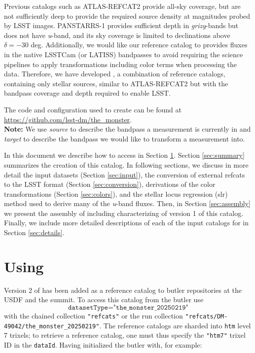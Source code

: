 Previous catalogs such as ATLAS-REFCAT2 \citep{Tonry:2018} provide all-sky coverage, but are not sufficiently deep to provide the required source density at magnitudes probed by LSST images.
PANSTARRS-1\citep[PS1;][]{Chambers:2016} provides sufficient depth in \emph{grizy}-bands but does not have \emph{u}-band, and its sky coverage is limited to declinations above $\delta = -30$ deg.
Additionally, we would like our reference catalog to provides fluxes in the native LSSTCam (or LATISS) bandpasses to avoid requiring the science pipelines to apply transformations including color terms when processing the data.
Therefore, we have developed \monster, a combination of reference catalogs, containing only stellar sources, similar to ATLAS-REFCAT2 but with the bandpass coverage and depth required to enable LSST.

The code and configuration used to create \monster can be found at \url{https://github.com/lsst-dm/the_monster}.\\

\textbf{Note:} We use \emph{source} to describe the bandpass a measurement is currently in and \emph{target} to describe the bandpass we would like to transform a measurement into.

In this document we describe how to access \monster in Section \ref{sec:using}. Section \ref{sec:summary} summarizes the creation of this catalog. In following sections, we discuss in more detail the input datasets (Section \ref{sec:input}), the
conversion of external refcats to the LSST format (Section \ref{sec:conversion}), derivations of the color transformations (Section \ref{sec:colors}), and the stellar locus regression (slr) method used to derive many of the \emph{u}-band fluxes.
Then, in Section \ref{sec:assembly} we present the assembly of \monster including characterizing of version 1 of this catalog.
Finally, we include more detailed descriptions of each of the input catalogs for \monster in Section \ref{sec:details}.

\section{Using \monster}
\label{sec:using}
Version 2 of \monster has been added as a reference catalog to butler repositories at the USDF and the summit.
To access this catalog from the butler use
$$\texttt{datasetType="the\_monster\_20250219"}$$
with the chained collection \texttt{"refcats"} or the run collection \texttt{"refcats/DM-49042/the\_monster\_20250219"}.
The reference catalogs are sharded into \texttt{htm} level 7 trixels; to retrieve a reference catalog, one must thus specify the \texttt{"htm7"} trixel ID in the \texttt{dataId}. Having initialized the butler with, for example:

